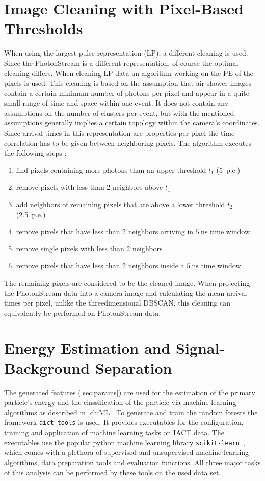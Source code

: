 \section{Image Cleaning with Pixel-Based Thresholds}
\label{sec:thresh}
%
When using the largest pulse representation (LP), a different cleaning is
used. Since the PhotonStream is a different representation, of course the
optimal cleaning differs. When cleaning LP data an algorithm working on the PE
of the pixels is used. This cleaning is based on the assumption that air-shower
images contain a certain minimum number of photons per pixel and appear in a
quite small range of time and space within one event. It does not contain any
assumptions on the number of clusters per event, but with the mentioned
assumptions generally implies a certain topology within the camera's
coordinates. Since arrival times in this representation are properties per
pixel the time correlation has to be given between neighboring pixels. The
algorithm executes the following steps \cite{facttools}:
%
\begin{enumerate}
  \item find pixels containing more photons than an upper threshold $t_1$ (5~p.e.)
  \item remove pixels with less than 2 neighbors above $t_1$
  \item add neighbors of remaining pixels that are above a lower threshold $t_2$ (2.5~p.e.)
  \item remove pixels that have less than 2 neighbors arriving in $\SI{5}{\nano\second}$ time window
  \item remove single pixels with less than 2 neighbors
  \item remove pixels that have less than 2 neighbors inside a $\SI{5}{\nano\second}$ time window
\end{enumerate}
%
The remaining pixels are considered to be the cleaned image. When projecting
the PhotonStream data into a camera image and calculating the mean arrival
times per pixel, unlike the threedimensional DBSCAN, this cleaning can
equivalently be performed on PhotonStream data.


\section{Energy Estimation and Signal-Background Separation}
%
The generated features (\autoref{sec:params}) are used for the estimation of
the primary particle's energy and the classification of the particle via
machine learning algorithms as described in \autoref{ch:ML}. To generate and
train the random forests the framework \texttt{aict-tools} \cite{aicttools} is
used. It provides executables for the configuration, training and application
of machine learning tasks on IACT data. The executables use the popular python
machine learning library \texttt{scikit-learn}~\cite{scikit-learn}, which comes
with a plethora of supervised and unsupervised machine learning algorithms,
data preparation tools and evaluation functions. All three major tasks of this
analysis can be performed by these tools on the used data set.
